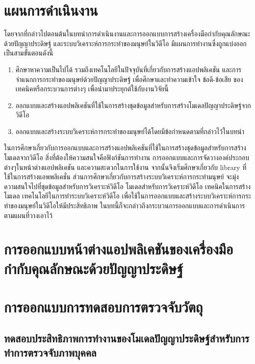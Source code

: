 \vspace{3mm}
\section{แผนการดำเนินงาน}
โดยจากที่กล่าวไปตอนต้นในบทนำการดำเนินงานและการออกแบบการสร้างเครื่องมือกำกับคุณลักษณะด้วยปัญญาประดิษฐ์
และระบบวิเคราะห์การกระทำของมนุษย์ในวิดีโอ มีแผนการทำงานซึ่งถูกแบ่งออกเป็นสามขั้นตอนดังนี้
\begin{enumerate}
	\setlength\itemsep{-0.25em}
	\item ศึกษาหาความเป็นไปได้ รวมถึงเทคโนโลยีในปัจจุบันที่เกี่ยวกับการสร้างแอปพลิเคชัน และการจำแนกการกระทำของมนุษย์ด้วยปัญญาประดิษฐ์ 
	เพื่อศึกษาและทำความเข้าใจ ข้อดี-ข้อเสีย ของเทคนิคหรือกระบวนการต่างๆ เพื่อนำมาประยุกต์ใช้กับงานวิจัยนี้
	\item ออกแบบและสร้างแอปพลิเคชันที่ใช้ในการสร้างชุดข้อมูลสำหรับการสร้างโมเดลปัญญาประดิษฐ์จากวิดีโอ
	\item ออกแบบและสร้างระบบวิเคราะห์การกระทำของมนุษย์ได้โดยมีข้อกำหนดตามที่กล่าวไว้ในบทนำ
\end{enumerate}
\clearpage

ในการศึกษาเกี่ยวกับการออกแบบและการสร้างแอปพลิเคชันที่ใช้ในการสร้างชุดข้อมูลสำหรับการสร้างโมเดลจากวิดีโอ 
สิ่งที่ต้องให้ความสนใจคือฟังก์ชันการทำงาน การออกแบบและการจัดวางองค์ประกอบต่างๆในหน้าต่างแอปพลิเคชัน
และความสะดวกในการใช้งาน จากนั้นจึงเริ่มศึกษาเกี่ยวกับ library ที่ใช้ในการสร้างแอพพลิเคชั่น
ส่วนการศึกษาเกี่ยวกับการสร้างระบบวิเคราะห์การกระทำมนุษย์ จะมุ่งความสนใจไปที่ชุดข้อมูลสำหรับการวิเคราะห์วิดีโอ
โมเดลสำหรับการวิเคราะห์วิดีโอ เทคนิคในการสร้างโมเดล เทคโนโลยีในการทำระบบวิเคราะห์วิดีโอ
เพื่อใช้ในการออกแบบและสร้างระบบวิเคราะห์การกระทำของมนุษย์ในวิดีโอให้มีประสิทธิภาพ
ในบทนี้ก็จะกล่าวถึงกระบวนการออกแบบและการดำเนินการตามแผนที่วางเอาไว้
\section{การออกแบบหน้าต่างแอปพลิเคชันของเครื่องมือกำกับคุณลักษณะด้วยปัญญาประดิษฐ์}

\clearpage

\section{การออกแบบการทดสอบการตรวจจับวัตถุ}
\subsection{ทดสอบประสิทธิภาพการทำงานของโมเดลปัญญาประดิษฐ์สำหรับการทำการตรวจจับภาพบุคคล}

\clearpage

